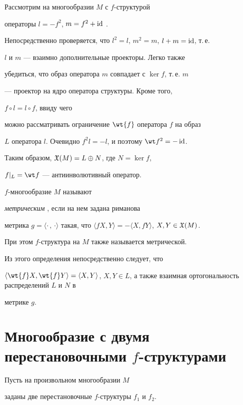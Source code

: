 Рассмотрим на многообразии $M$ с $f$-структурой


операторы $l=-f^2$, $m=f^2+\operatorname{id}$ \cite{YK}.


Непосредственно проверяется, что $l^2=l$, $m^2=m$, $l+m=\operatorname{id}$, т.\,е.


$l$ и $m$ --- взаимно дополнительные проекторы. Легко также


убедиться, что образ оператора $m$ совпадает с $\ker f$, т.\,е. $m$


--- проектор на ядро оператора структуры. Кроме того,


$f\circ l=l\circ f$, ввиду чего


можно рассматривать ограничение $\wt{f}$ оператора $f$ на образ


$L$ оператора $l$. Очевидно $f^2l=-l$, и поэтому $\wt f^2=-\id$.


Таким образом, $\frak{X}(M)=L\oplus N$, где $N=\ker f$,


$f|_L=\wt f$ --- антиинволютивный оператор.





$f$-многообразие $M$ называют


{\it метрическим} \cite{Kir}, если на нем задана риманова


метрика $g=\langle\cdot\,,\,\cdot\rangle$ такая, что $\langle


fX,Y \rangle=-\langle X,f Y\rangle$, $X,Y\in\frak{X}(M)$.


При этом $f$-структура на $M$ также называется метрической.


Из этого определения непосредственно следует, что


$\langle\wt{f}X,\wt{f}Y\rangle=\langle X,Y\rangle$, $X,Y\in


L$, а также взаимная ортогональность распределений $L$ и $N$ в


метрике $g$.








\section{Многообразие с двумя перестановочными $f$-структурами}





Пусть на произвольном многообразии $M$


заданы две перестановочные $f$-структуры $f_1$ и $f_2$.





